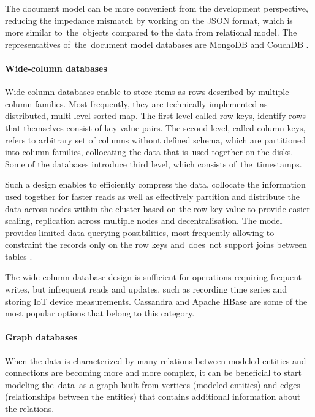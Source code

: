 The document model can be more convenient from the development perspective, reducing the impedance mismatch by working on the JSON format, which is more similar to~the~objects compared to the data from relational model. The representatives of~the~document model databases are MongoDB \cite{MongoDB} and CouchDB \cite{CouchDB}.

\paragraph{Wide-column databases}

Wide-column databases enable to store items as rows described by multiple column families. Most frequently, they are technically implemented as distributed, multi-level sorted map. The first level called row keys, identify rows that themselves consist of key-value pairs. The second level, called column keys, refers to arbitrary set of columns without defined schema, which are partitioned into column families, collocating the data that is~used together on the disks. Some of the databases introduce third level, which consists of~the~timestamps.

Such a design enables to efficiently compress the data, collocate the information used together for faster reads as well as effectively partition and distribute the data across nodes within the cluster based on the row key value to provide easier scaling, replication across multiple nodes and decentralisation. The model provides limited data querying possibilities, most frequently allowing to constraint the records only on the row keys and~does~not support joins between tables \cite{NoSQLDatabaseSystemsSurveyDecisionGuidance}.

The wide-column database design is sufficient for operations requiring frequent writes, but infrequent reads and updates, such as recording time series and storing IoT device measurements. Cassandra \cite{Cassandra} and Apache HBase \cite{HBase} are some of the most popular options that belong to this category.

\paragraph{Graph databases}

When the data is characterized by many relations between modeled entities and connections are becoming more and more complex, it can be beneficial to start modeling the~data~as a graph built from vertices (modeled entities) and edges (relationships between the entities) that contains additional information about the relations. 

